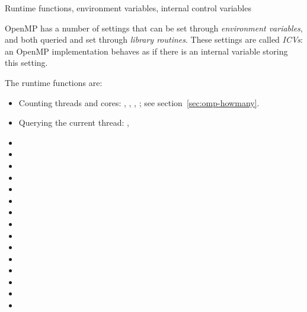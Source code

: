 
 {Runtime functions, environment variables, internal control variables}
\label{ref:omp-environ}

OpenMP has a number of settings that can be set through \emph{environment variables},
and both queried and set through \emph{library routines}. These settings are called
\emph{\acfp{ICV}}: an OpenMP implementation behaves as if there is an internal variable
storing this setting.

The runtime functions are:
\begin{itemize}
\item Counting threads and cores: ,
  ,
  , ;
  see section~\ref{sec:omp-howmany}.
\item Querying the current thread: , 
\item {}
\item {}
\item {}
\item {}
\item {}
\item {}
\item {}
\item {}
\item {}
\item {}
\item {}
\item {}
\item {}
\item {}
\item {}
\end{itemize}

